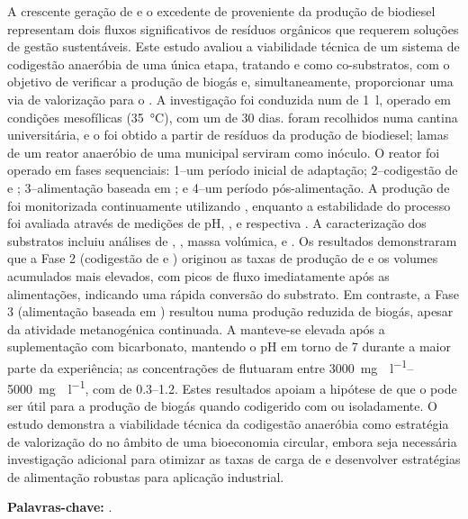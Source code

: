 \label{ch:resumo}

A crescente geração de  e o excedente de  proveniente da produção de biodiesel representam dois fluxos significativos de resíduos orgânicos que requerem soluções de gestão sustentáveis. Este estudo avaliou a viabilidade técnica de um sistema de codigestão anaeróbia de uma única etapa, tratando  e  como co-substratos, com o objetivo de verificar a produção de biogás e, simultaneamente, proporcionar uma via de valorização para o . A investigação foi conduzida num  de \qty{1}{\litre}, operado em condições mesofílicas (\qty{35}{\celsius}), com um  de \num{30} dias.  foram recolhidos numa cantina universitária, e o  foi obtido a partir de resíduos da produção de biodiesel; lamas de um reator anaeróbio de uma  municipal serviram como inóculo. O reator foi operado em fases sequenciais: 1–um período inicial de adaptação; 2–codigestão de  e ; 3–alimentação baseada em ; e 4–um período pós-alimentação. A produção de  foi monitorizada continuamente utilizando , enquanto a estabilidade do processo foi avaliada através de medições de pH, ,  e respectiva . A caracterização dos substratos incluiu análises de , , massa volúmica,  e . Os resultados demonstraram que a Fase 2 (codigestão de  e ) originou as taxas de produção de  e os volumes acumulados mais elevados, com picos de fluxo imediatamente após as alimentações, indicando uma rápida conversão do substrato. Em contraste, a Fase 3 (alimentação baseada em ) resultou numa produção reduzida de biogás, apesar da atividade metanogénica continuada. A  manteve-se elevada após a suplementação com bicarbonato, mantendo o pH em torno de \num{7} durante a maior parte da experiência; as concentrações de  flutuaram entre \qtyrange{3000}{5000}{\milli\gram\CHCOOH\per\litre}, com  de \numrange{0,3}{1,2}. Estes resultados apoiam a hipótese de que o  pode ser útil para a produção de biogás quando codigerido com  ou isoladamente. O estudo demonstra a viabilidade técnica da codigestão anaeróbia como estratégia de valorização do  no âmbito de uma bioeconomia circular, embora seja necessária investigação adicional para otimizar as taxas de carga de  e desenvolver estratégias de alimentação robustas para aplicação industrial.

\vspace{1em}
\noindent\textbf{Palavras-chave:} \palavraschaves.
